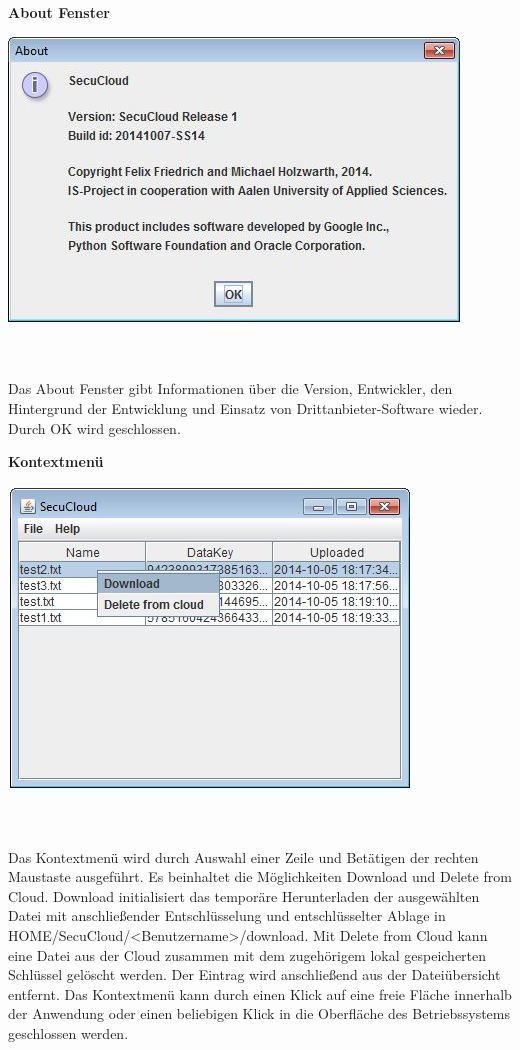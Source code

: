 \documentclass[12pt,a4paper,bibliography=totocnumbered,listof=totocnumbered]{scrartcl}
\begin{document}
\textbf{About Fenster}
\vspace{1em}
$\;$\\
\begin{minipage}{\linewidth}
	\centering
	\includegraphics[width=0.4\linewidth]{AboutPopUp.jpg}
	\label{AboutPopUp}
\end{minipage}
\\\\Das About Fenster gibt Informationen über die Version, Entwickler, den Hintergrund der Entwicklung und Einsatz von Drittanbieter-Software wieder. Durch OK wird geschlossen.

\textbf{Kontextmenü}
\vspace{1em}
$\;$\\
\begin{minipage}{\linewidth}
	\centering
	\includegraphics[width=0.4\linewidth]{Kontext.jpg}
	\label{Kontext}
\end{minipage}
\\\\Das Kontextmenü wird durch Auswahl einer Zeile und Betätigen der rechten Maustaste ausgeführt. Es beinhaltet die Möglichkeiten Download und Delete from Cloud. Download initialisiert das temporäre Herunterladen der ausgewählten Datei mit anschließender Entschlüsselung und entschlüsselter Ablage in HOME/SecuCloud/\textless Benutzername\textgreater/download. Mit Delete from Cloud kann eine Datei aus der Cloud zusammen mit dem zugehörigem lokal gespeicherten Schlüssel gelöscht werden. Der Eintrag wird anschließend aus der Dateiübersicht entfernt. Das Kontextmenü kann durch einen Klick auf eine freie Fläche innerhalb der Anwendung oder einen beliebigen Klick in die Oberfläche des Betriebssystems geschlossen werden.
\end{document}
